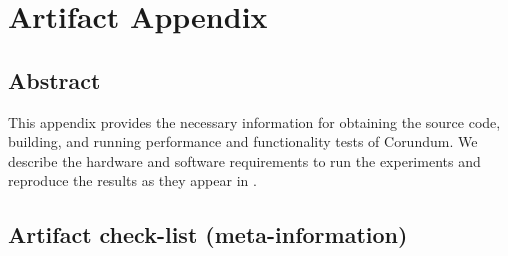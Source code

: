 

\appendix
\section{Artifact Appendix}

\subsection{Abstract}

This appendix provides the necessary information for obtaining the source code,
building, and running performance and functionality tests of Corundum. 
We describe the hardware and software requirements to run the
experiments and reproduce the results as they appear in .

\subsection{Artifact check-list (meta-information)}

